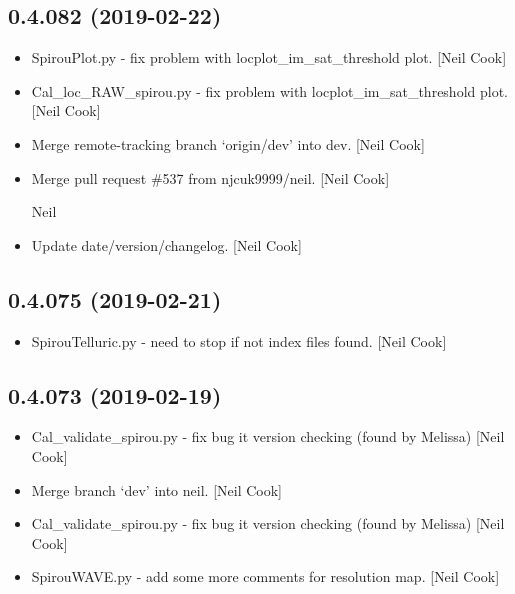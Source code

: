 \documentclass[a4paper,10pt,english]{report}
\begin{document}
\subsection{0.4.082 (2019-02-22)}
\label{\detokenize{misc/changelog:id179}}\begin{itemize}
\item {} 
SpirouPlot.py - fix problem with locplot\_im\_sat\_threshold plot. {[}Neil
Cook{]}

\item {} 
Cal\_loc\_RAW\_spirou.py - fix problem with locplot\_im\_sat\_threshold
plot. {[}Neil Cook{]}

\item {} 
Merge remote-tracking branch ‘origin/dev’ into dev. {[}Neil Cook{]}

\item {} 
Merge pull request \#537 from njcuk9999/neil. {[}Neil Cook{]}

Neil

\item {} 
Update date/version/changelog. {[}Neil Cook{]}

\end{itemize}


\subsection{0.4.075 (2019-02-21)}
\label{\detokenize{misc/changelog:id180}}\begin{itemize}
\item {} 
SpirouTelluric.py - need to stop if not index files found. {[}Neil Cook{]}

\end{itemize}


\subsection{0.4.073 (2019-02-19)}
\label{\detokenize{misc/changelog:id181}}\begin{itemize}
\item {} 
Cal\_validate\_spirou.py - fix bug it version checking (found by
Melissa) {[}Neil Cook{]}

\item {} 
Merge branch ‘dev’ into neil. {[}Neil Cook{]}

\item {} 
Cal\_validate\_spirou.py - fix bug it version checking (found by
Melissa) {[}Neil Cook{]}

\item {} 
SpirouWAVE.py - add some more comments for resolution map. {[}Neil Cook{]}

\end{itemize}
\end{document}
